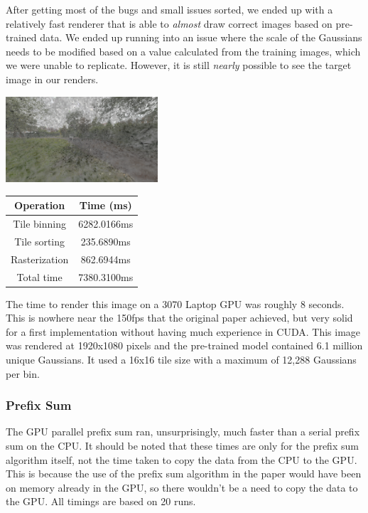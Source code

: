 \documentclass[12pt, a4paper, twocolumn]{article}
\begin{document}
After getting most of the bugs and small issues sorted, we ended up with a relatively fast renderer that is able to \textit{almost} draw correct images based on pre-trained data. We ended up running into an issue where the scale of the Gaussians needs to be modified based on a value calculated from the training images, which we were unable to replicate. However, it is still \textit{nearly} possible to see the target image in our renders.

\includegraphics[width=0.425\textwidth]{test.png}

\begin{center}
\begin{tabular}{ | c | c | }
\hline
Operation & Time (ms) \\
\hline
Tile binning & 6282.0166ms \\
\hline
Tile sorting & 235.6890ms \\
\hline
Rasterization & 862.6944ms \\
\hline
Total time & 7380.3100ms \\
\hline
\end{tabular}
\end{center}

The time to render this image on a 3070 Laptop GPU was roughly 8 seconds. This is nowhere near the 150fps that the original paper achieved, but very solid for a first implementation without having much experience in CUDA. This image was rendered at 1920x1080 pixels and the pre-trained model contained 6.1 million unique Gaussians. It used a 16x16 tile size with a maximum of 12,288 Gaussians per bin.

\subsubsection{Prefix Sum}
The GPU parallel prefix sum ran, unsurprisingly, much faster than a serial prefix sum on the CPU. It should be noted that these times are only for the prefix sum algorithm itself, not the time taken to copy the data from the CPU to the GPU. This is because the use of the prefix sum algorithm in the paper would have been on memory already in the GPU, so there wouldn't be a need to copy the data to the GPU.
All timings are based on 20 runs.
\end{document}
